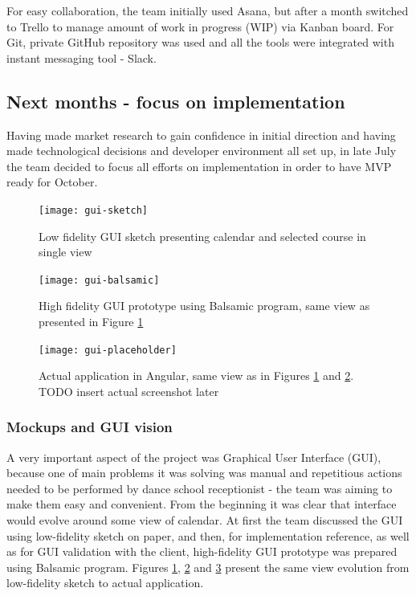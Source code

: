 \documentclass{article}
\begin{document}
For easy collaboration, the team initially used Asana, but after a month switched to Trello to manage amount of work in progress (WIP) via Kanban board. For Git, private GitHub repository was used and all the tools were integrated with instant messaging tool - Slack.

\subsection{Next months - focus on implementation}
Having made market research to gain confidence in initial direction and having made technological decisions and developer environment all set up, in late July the team decided to focus all efforts on implementation in order to have MVP ready for October.

\begin{figure}[h]
    \texttt{[image: gui-sketch]}
    \caption{Low fidelity GUI sketch presenting calendar and selected course in single view}
    \label{fig:gui-sketch}
\end{figure}
\begin{figure}[h]
    \texttt{[image: gui-balsamic]}
    \caption{High fidelity GUI prototype using Balsamic program, same view as presented in Figure \ref{fig:gui-sketch}}
    \label{fig:gui-balsamic}
\end{figure}
\begin{figure}[h]
    \texttt{[image: gui-placeholder]}
    \caption{Actual application in Angular, same view as in Figures \ref{fig:gui-sketch} and \ref{fig:gui-balsamic}. TODO insert actual screenshot later}
    \label{fig:gui-angular}
\end{figure}

\subsubsection{Mockups and GUI vision}
A very important aspect of the project was Graphical User Interface (GUI), because one of main problems it was solving was manual and repetitious actions needed to be performed by dance school receptionist - the team was aiming to make them easy and convenient. From the beginning it was clear that interface would evolve around some view of calendar. At first the team discussed the GUI using low-fidelity sketch on paper, and then, for implementation reference, as well as for GUI validation with the client, high-fidelity GUI prototype was prepared using Balsamic program. Figures \ref{fig:gui-sketch}, \ref{fig:gui-balsamic} and \ref{fig:gui-angular} present the same view evolution from low-fidelity sketch to actual application.
\end{document}
